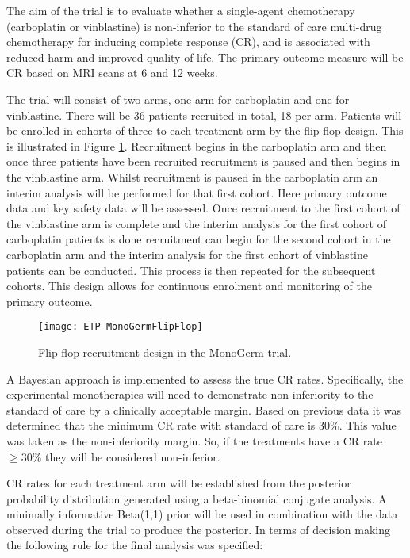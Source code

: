 The aim of the trial is to evaluate whether a single-agent chemotherapy (carboplatin or vinblastine) is non-inferior to	the standard of care multi-drug chemotherapy for inducing complete response (CR), and is associated with reduced harm and improved quality of life. The primary outcome measure will be CR based on MRI scans at 6 and 12 weeks. 

The trial will consist of two arms, one arm for carboplatin and one for vinblastine. There will be 36 patients recruited in total, 18 per arm. Patients will be enrolled in cohorts of three to each treatment-arm by the flip-flop design. This is illustrated in Figure \ref{fig_etp:MonoGermFlipFlop}. Recruitment begins in the carboplatin arm and then once three patients have been recruited recruitment is paused and then begins in the vinblastine arm. Whilst recruitment is paused in the carboplatin arm an interim analysis will be performed for that first cohort. Here primary outcome data and key safety data will be assessed. Once recruitment to the first cohort of the vinblastine arm is complete and the interim analysis for the first cohort of carboplatin patients is done recruitment can begin for the second cohort in the carboplatin arm and the interim analysis for the first cohort of vinblastine patients can be conducted. This process is then repeated for the subsequent cohorts. This design allows for continuous enrolment and monitoring of the primary outcome. 

\begin{figure}[h!]
	\centering
	\caption{Flip-flop recruitment design in the MonoGerm trial.}
	\label{fig_etp:MonoGermFlipFlop}
	\texttt{[image: ETP-MonoGermFlipFlop]}
\end{figure}

A Bayesian approach is implemented to assess the true CR rates. Specifically, the experimental monotherapies will need to demonstrate non-inferiority to the standard of care by a clinically acceptable margin. Based on previous data it was determined that the minimum CR rate with standard of care is 30\%. This value was taken as the non-inferiority margin. So, if the treatments have a CR rate $\geq30$\% they will be considered non-inferior. 

CR rates for each treatment arm will be established from the posterior probability distribution generated using a beta-binomial conjugate analysis. A minimally informative Beta(1,1) prior will be used in combination with the data observed during the trial to produce the posterior. In terms of decision making the following rule for the final analysis was specified: 

